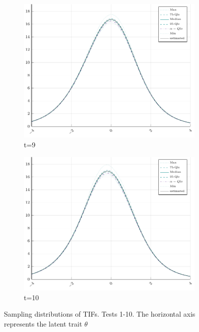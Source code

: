 \begin{figure}[H]
\begin{subfigure}[t]{0.31\textwidth}
		\includegraphics[width=\linewidth]{Figures/real/9_infoplot.pdf}
		\caption{t=9} 
	\end{subfigure}
	\begin{subfigure}[t]{0.31\textwidth}
		\centering
		\includegraphics[width=\linewidth]{Figures/real/10_infoplot.pdf}
		\caption{t=10} 
	\end{subfigure}
	\caption{Sampling distributions of TIFs. Tests 1-10. The horizontal axis represents the latent trait $\theta$	\label{fig:taTIF}}
\end{figure}

